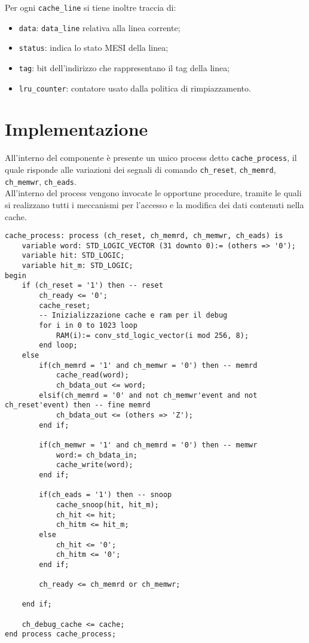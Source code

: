 Per ogni \texttt{cache\_line} si tiene inoltre traccia di:
\begin{itemize}
  \item \texttt{data}: \texttt{data\_line} relativa alla linea corrente;
  \item \texttt{status}: indica lo stato MESI della linea;
  \item \texttt{tag}: bit dell'indirizzo che rappresentano il tag della linea;
  \item \texttt{lru\_counter}: contatore usato dalla politica di rimpiazzamento.
\end{itemize}

\section{Implementazione}

All'interno del componente \`e presente un unico process detto \texttt{cache\_process}, il quale risponde alle variazioni dei segnali di comando \texttt{ch\_reset}, \texttt{ch\_memrd}, \texttt{ch\_memwr}, \texttt{ch\_eads}.\\

All'interno del process vengono invocate le opportune procedure, tramite le quali si realizzano tutti i meccanismi per l'accesso e la modifica dei dati contenuti nella cache.\\



\begin{lstlisting}
cache_process: process (ch_reset, ch_memrd, ch_memwr, ch_eads) is
	variable word: STD_LOGIC_VECTOR (31 downto 0):= (others => '0');
	variable hit: STD_LOGIC;
	variable hit_m: STD_LOGIC;
begin
	if (ch_reset = '1') then -- reset
		ch_ready <= '0';
		cache_reset;
		-- Inizializzazione cache e ram per il debug			
		for i in 0 to 1023 loop
			RAM(i):= conv_std_logic_vector(i mod 256, 8);
		end loop;
	else
		if(ch_memrd = '1' and ch_memwr = '0') then -- memrd
			cache_read(word);
			ch_bdata_out <= word;
		elsif(ch_memrd = '0' and not ch_memwr'event and not ch_reset'event) then -- fine memrd
			ch_bdata_out <= (others => 'Z');
		end if;
				
		if(ch_memwr = '1' and ch_memrd = '0') then -- memwr
			word:= ch_bdata_in;
			cache_write(word);
		end if;
		
		if(ch_eads = '1') then -- snoop
			cache_snoop(hit, hit_m);
			ch_hit <= hit;
			ch_hitm <= hit_m;
		else
			ch_hit <= '0';
			ch_hitm <= '0';
		end if;
		
		ch_ready <= ch_memrd or ch_memwr;
			
	end if;
		
	ch_debug_cache <= cache;
end process cache_process;
\end{lstlisting}

